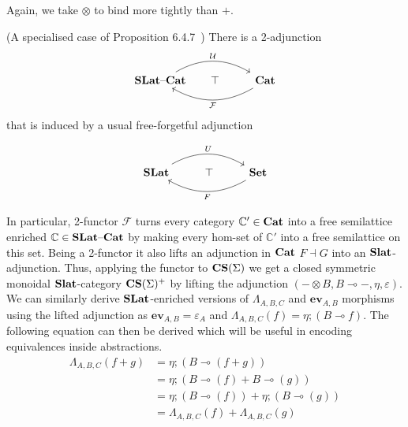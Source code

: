     Again, we take $\otimes$ to bind more tightly than $+$.
    
    \begin{proposition}(A specialised case of Proposition 6.4.7~\cite{Borceux_1994})
    There is a 2-adjunction 
    \[\begin{tikzcd}
        \catname{SLat}\text{--}\catname{Cat}\arrow[rr, "\mathcal{U}", bend left] & \hspace{-1em}\top & \catname{Cat} \arrow[ll, "\mathcal{F}", bend left]
        \end{tikzcd}
    \]
    that is induced by a usual free-forgetful adjunction 
    
    \[\begin{tikzcd}
        \catname{SLat} \arrow[rr, "U", bend left] & \top & \catname{Set} \arrow[ll, "F", bend left]
        \end{tikzcd}
    \]
    \end{proposition}
    
In particular, 2-functor $\mathcal{F}$ turns every category $\mathbb{C'} \in \mathbf{Cat}$ into a free semilattice enriched $\mathbb{C} \in \mathbf{SLat}\text{--}\mathbf{Cat}$ by making every hom-set of $\mathbb{C'}$ into a free semilattice on this set.
Being a 2-functor it also lifts an adjunction in $\mathbf{Cat}$ $F \dashv G$ into an $\mathbf{Slat}$-adjunction.
Thus, applying the functor to $\mathbf{CS}(\Sigma)$ we get a closed symmetric monoidal $\mathbf{Slat}$-category $\mathbf{CS}(\Sigma)^{+}$ by lifting the adjunction $(- \otimes B, B \multimap{} -, \eta, \varepsilon)$.
We can similarly derive $\mathbf{SLat}$-enriched versions of  $\Lambda_{A,B,C}$ and $\textbf{ev}_{A,B}$ morphisms using the lifted adjunction as $\textbf{ev}_{A,B} = \varepsilon_{A}$ and $\Lambda_{A,B,C}(f) = \eta; (B \multimap{} f)$.
The following equation can then be derived which will be useful in encoding equivalences inside abstractions.
\begin{align*}
\Lambda_{A,B,C}(f + g) &= \eta;(B \multimap (f + g))\\
                       &= \eta;(B \multimap (f) + B \multimap (g))\\
                       &= \eta;(B \multimap (f)) + \eta;(B \multimap (g))\\
                       &= \Lambda_{A,B,C}(f) + \Lambda_{A,B,C}(g)
\end{align*}

